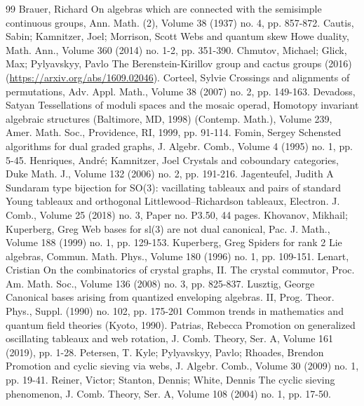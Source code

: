 \documentclass[10pt]{article}
\theoremstyle{definition}
\begin{document}
\begin{thebibliography}{99}
 Brauer, Richard On algebras which are connected with the semisimple continuous groups, Ann. Math. (2), Volume 38 (1937) no. 4, pp. 857-872.
 Cautis, Sabin; Kamnitzer, Joel; Morrison, Scott Webs and quantum skew Howe duality, Math. Ann., Volume 360 (2014) no. 1-2, pp. 351-390.
 Chmutov, Michael; Glick, Max; Pylyavskyy, Pavlo The Berenstein-Kirillov group and cactus groups (2016) (\url{https://arxiv.org/abs/1609.02046}).
 Corteel, Sylvie Crossings and alignments of permutations, Adv. Appl. Math., Volume 38 (2007) no. 2, pp. 149-163.
 Devadoss, Satyan Tessellations of moduli spaces and the mosaic operad, Homotopy invariant algebraic structures (Baltimore, MD, 1998) (Contemp. Math.), Volume 239, Amer. Math. Soc., Providence, RI, 1999, pp. 91-114.
 Fomin, Sergey Schensted algorithms for dual graded graphs, J. Algebr. Comb., Volume 4 (1995) no. 1, pp. 5-45.
 Henriques, André; Kamnitzer, Joel Crystals and coboundary categories, Duke Math. J., Volume 132 (2006) no. 2, pp. 191-216.
 Jagenteufel, Judith A Sundaram type bijection for SO(3): vacillating tableaux and pairs of standard Young tableaux and orthogonal Littlewood–Richardson tableaux, Electron. J. Comb., Volume 25 (2018) no. 3, Paper no. P3.50, 44 pages.
 Khovanov, Mikhail; Kuperberg, Greg Web bases for sl(3) are not dual canonical, Pac. J. Math., Volume 188 (1999) no. 1, pp. 129-153.
 Kuperberg, Greg Spiders for rank 2 Lie algebras, Commun. Math. Phys., Volume 180 (1996) no. 1, pp. 109-151.
 Lenart, Cristian On the combinatorics of crystal graphs, II. The crystal commutor, Proc. Am. Math. Soc., Volume 136 (2008) no. 3, pp. 825-837.
 Lusztig, George Canonical bases arising from quantized enveloping algebras. II, Prog. Theor. Phys., Suppl. (1990) no. 102, pp. 175-201 Common trends in mathematics and quantum field theories (Kyoto, 1990).
 Patrias, Rebecca Promotion on generalized oscillating tableaux and web rotation, J. Comb. Theory, Ser. A, Volume 161 (2019), pp. 1-28.
 Petersen, T. Kyle; Pylyavskyy, Pavlo; Rhoades, Brendon Promotion and cyclic sieving via webs, J. Algebr. Comb., Volume 30 (2009) no. 1, pp. 19-41.
 Reiner, Victor; Stanton, Dennis; White, Dennis The cyclic sieving phenomenon, J. Comb. Theory, Ser. A, Volume 108 (2004) no. 1, pp. 17-50.

\end{thebibliography}
\end{document}
